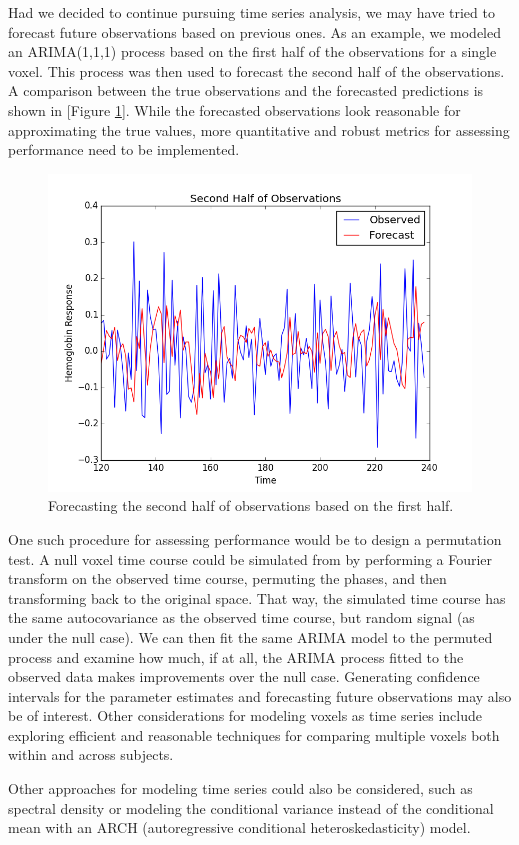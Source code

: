 \par Had we decided to continue pursuing time series analysis, we may have 
tried to forecast future observations based on previous ones. As an example, 
we modeled an ARIMA(1,1,1) process based on the first half of the 
observations for a single voxel. This process was then used to forecast the 
second half of the observations. A comparison between the true observations 
and the forecasted predictions is shown in [Figure \ref{fig:ts-preds}]. 
While the forecasted observations look reasonable for approximating the true 
values, more quantitative and robust metrics for assessing performance need 
to be implemented. 

\begin{figure}[ht]
\centering
\includegraphics[scale=0.5]{images/ts-preds.png}
\caption{Forecasting the second half of observations based on the first 
half.}
\label{fig:ts-preds}
\end{figure}

\par One such procedure for assessing performance would be to design a 
permutation test. A null voxel time course could be simulated from by 
performing a Fourier transform on the observed time course, permuting the 
phases, and then transforming back to the original space. That way, the 
simulated time course has the same autocovariance as the observed time 
course, but random signal (as under the null case). We can then fit the 
same ARIMA model to the permuted process and examine how much, if at all, 
the ARIMA process fitted to the observed data makes improvements over the 
null case. Generating confidence intervals for the parameter estimates and 
forecasting future observations may also be of interest. Other considerations 
for modeling voxels as time series include exploring efficient and 
reasonable techniques for comparing multiple voxels both within and across 
subjects. 

\par Other approaches for modeling time series could also be considered, 
such as spectral density or modeling the conditional variance instead of the 
conditional mean with an ARCH (autoregressive conditional 
heteroskedasticity) model. 




